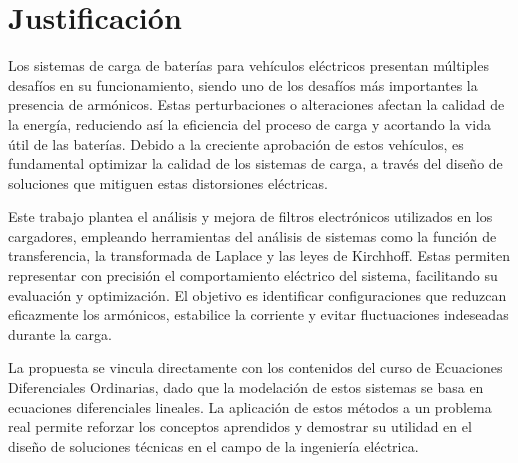 \section{Justificación}
Los sistemas de carga de baterías para vehículos eléctricos presentan múltiples desafíos en su funcionamiento, siendo uno de los desafíos más importantes la presencia de armónicos. Estas perturbaciones o alteraciones afectan la calidad de la energía, reduciendo así la eficiencia del proceso de carga y acortando la vida útil de las baterías. Debido a la creciente aprobación de estos vehículos, es fundamental optimizar la calidad de los sistemas de carga, a través del diseño de soluciones que mitiguen estas distorsiones eléctricas.

Este trabajo plantea el análisis y mejora de filtros electrónicos utilizados en los cargadores, empleando herramientas del análisis de sistemas como la función de transferencia, la transformada de Laplace y las leyes de Kirchhoff. Estas permiten representar con precisión el comportamiento eléctrico del sistema, facilitando su evaluación y optimización. El objetivo es identificar configuraciones que reduzcan eficazmente los armónicos, estabilice la corriente y evitar fluctuaciones indeseadas durante la carga.

La propuesta se vincula directamente con los contenidos del curso de Ecuaciones Diferenciales Ordinarias, dado que la modelación de estos sistemas se basa en ecuaciones diferenciales lineales. La aplicación de estos métodos a un problema real permite reforzar los conceptos aprendidos y demostrar su utilidad en el diseño de soluciones técnicas en el campo de la ingeniería eléctrica.